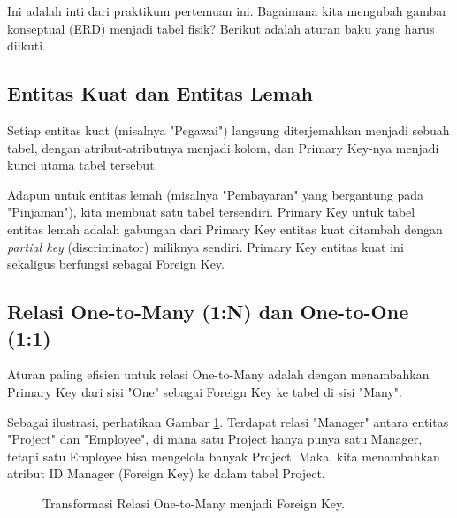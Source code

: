 \documentclass[11pt,a4paper]{article}
\begin{document}
Ini adalah inti dari praktikum pertemuan ini. Bagaimana kita mengubah gambar konseptual (ERD) menjadi tabel fisik? Berikut adalah aturan baku yang harus diikuti.

\subsection{Entitas Kuat dan Entitas Lemah}
Setiap entitas kuat (misalnya "Pegawai") langsung diterjemahkan menjadi sebuah tabel, dengan atribut-atributnya menjadi kolom, dan Primary Key-nya menjadi kunci utama tabel tersebut.

Adapun untuk entitas lemah (misalnya "Pembayaran" yang bergantung pada "Pinjaman"), kita membuat satu tabel tersendiri. Primary Key untuk tabel entitas lemah adalah gabungan dari Primary Key entitas kuat ditambah dengan \textit{partial key} (discriminator) miliknya sendiri. Primary Key entitas kuat ini sekaligus berfungsi sebagai Foreign Key.

\subsection{Relasi One-to-Many (1:N) dan One-to-One (1:1)}
Aturan paling efisien untuk relasi One-to-Many adalah dengan menambahkan Primary Key dari sisi "One" sebagai Foreign Key ke tabel di sisi "Many".

Sebagai ilustrasi, perhatikan Gambar \ref{fig:one_to_many}. Terdapat relasi "Manager" antara entitas "Project" dan "Employee", di mana satu Project hanya punya satu Manager, tetapi satu Employee bisa mengelola banyak Project. Maka, kita menambahkan atribut ID Manager (Foreign Key) ke dalam tabel Project.

\begin{figure}[H]
	\centering
	\caption{Transformasi Relasi One-to-Many menjadi Foreign Key.}
	\label{fig:one_to_many}
\end{figure}
\end{document}
